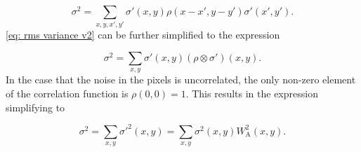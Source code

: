 \begin{equation}\label{eq: rms variance v2}
    \sigma^2=\sum_{x,y,x',y'}\sigma'(x,y)\rho(x-x',y-y')\sigma'(x',y').
\end{equation}
\autoref{eq: rms variance v2} can be further simplified to the expression

\begin{equation}\label{eq: variance rms correlated}
    \sigma^2=\sum_{x,y}\sigma'(x,y)(\rho\otimes \sigma')(x,y).
\end{equation}
In the case that the noise in the pixels is uncorrelated, the only non-zero element of the correlation function is $\rho(0,0)=1$. This results in the expression simplifying to

\begin{equation}\label{eq: variance rms uncorrelated}
    \sigma^2=\sum_{x,y}\sigma'^2(x,y) =\sum_{x,y}\sigma^2(x,y)W_\mathrm{A}^2(x,y).
\end{equation}


\newpage